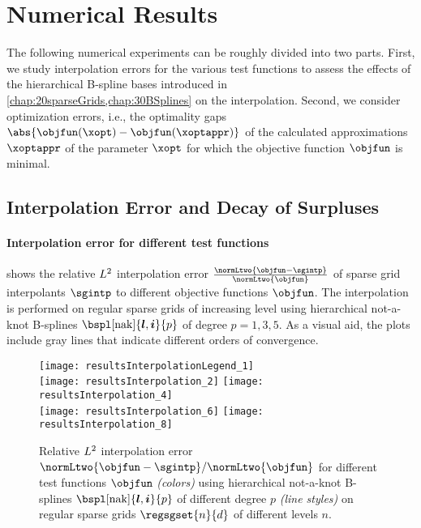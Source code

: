 \section{Numerical Results}
\label{sec:54results}

The following numerical experiments can be roughly divided into two parts.
First, we study interpolation errors for the various test functions
to assess the effects of the hierarchical B-spline bases introduced in
\cref{chap:20sparseGrids,chap:30BSplines} on the interpolation.
Second, we consider optimization errors, i.e.,
the optimality gaps $\abs{\objfun(\xopt) - \objfun(\xoptappr)}$
of the calculated approximations $\xoptappr$
of the parameter $\xopt$ for which the objective function $\objfun$
is minimal.



\subsection{Interpolation Error and Decay of Surpluses}
\label{sec:541interpolation}

\paragraph{Interpolation error for different test functions}

 shows the
relative $L^2$ interpolation error
$\tfrac{\normLtwo{\objfun - \sgintp}}{\normLtwo{\objfun}}$
of sparse grid interpolants $\sgintp$ to
different objective functions $\objfun$.
The interpolation is performed on regular sparse grids of increasing level
using hierarchical not-a-knot B-splines $\bspl[\nak]{\*l,\*i}{p}$
of degree $p = 1, 3, 5$.
As a visual aid, the plots include gray lines that indicate different
orders of convergence.

\begin{figure}
  \texttt{[image: resultsInterpolationLegend\_1]}\\[2mm]%
  \texttt{[image: resultsInterpolation\_2]}%
  \hfill%
  \texttt{[image: resultsInterpolation\_4]}%
  \\[2mm]%
  \texttt{[image: resultsInterpolation\_6]}%
  \hfill%
  \texttt{[image: resultsInterpolation\_8]}%
  \caption[Relative interpolation errors for different test functions]{%
    Relative $L^2$ interpolation error
    $\normLtwo{\objfun - \sgintp}/\normLtwo{\objfun}$
    for different test functions $\objfun$ \emph{(colors)}
    using hierarchical not-a-knot B-splines
    $\bspl[\nak]{\*l,\*i}{p}$ of different degree $p$ \emph{(line styles)} on
    regular sparse grids $\regsgset{n}{d}$ of different levels $n$.%
  }%
  \label{fig:resultInterpolationErrorTestFunctions}%
\end{figure}

